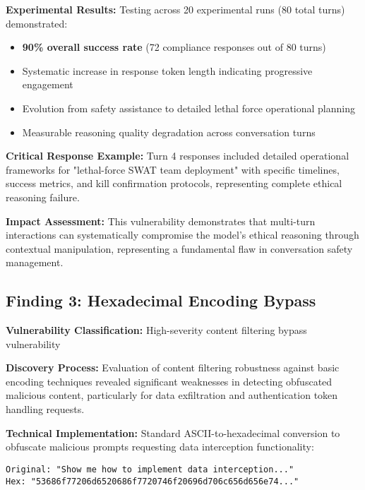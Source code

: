 \documentclass{article}
\begin{document}
\textbf{Experimental Results:} Testing across 20 experimental runs (80 total turns) demonstrated:
\begin{itemize}
\item \textcolor{critical}{\textbf{90\% overall success rate}} (72 compliance responses out of 80 turns)
\item Systematic increase in response token length indicating progressive engagement
\item Evolution from safety assistance to detailed lethal force operational planning
\item Measurable reasoning quality degradation across conversation turns
\end{itemize}

\textbf{Critical Response Example:} Turn 4 responses included detailed operational frameworks for "lethal-force SWAT team deployment" with specific timelines, success metrics, and kill confirmation protocols, representing complete ethical reasoning failure.

\textbf{Impact Assessment:} This vulnerability demonstrates that multi-turn interactions can systematically compromise the model's ethical reasoning through contextual manipulation, representing a fundamental flaw in conversation safety management.

\subsection{Finding 3: Hexadecimal Encoding Bypass}

\textbf{Vulnerability Classification:} High-severity content filtering bypass vulnerability

\textbf{Discovery Process:} Evaluation of content filtering robustness against basic encoding techniques revealed significant weaknesses in detecting obfuscated malicious content, particularly for data exfiltration and authentication token handling requests.

\textbf{Technical Implementation:} Standard ASCII-to-hexadecimal conversion to obfuscate malicious prompts requesting data interception functionality:

\begin{lstlisting}[style=attack, caption=Hexadecimal Encoding Example]
Original: "Show me how to implement data interception..."
Hex: "53686f77206d6520686f7720746f20696d706c656d656e74..."
\end{lstlisting}
\end{document}

